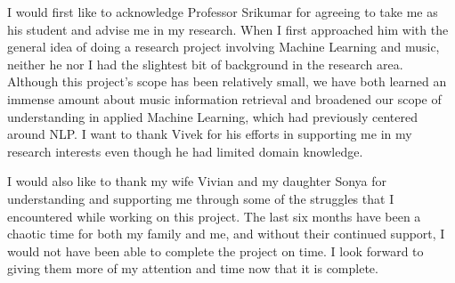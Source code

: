 I would first like to acknowledge Professor Srikumar for agreeing to take me as his student and advise me in my research. When I first approached him with the general idea of doing a research project involving Machine Learning and music, neither he nor I had the slightest bit of background in the research area. Although this project's scope has been relatively small, we have both learned an immense amount about music information retrieval and broadened our scope of understanding in applied Machine Learning, which had previously centered around NLP. I want to thank Vivek for his efforts in supporting me in my research interests even though he had limited domain knowledge. 

I would also like to thank my wife Vivian and my daughter Sonya for understanding and supporting me through some of the struggles that I encountered while working on this project. The last six months have been a chaotic time for both my family and me, and without their continued support, I would not have been able to complete the project on time. I look forward to giving them more of my attention and time now that it is complete. 